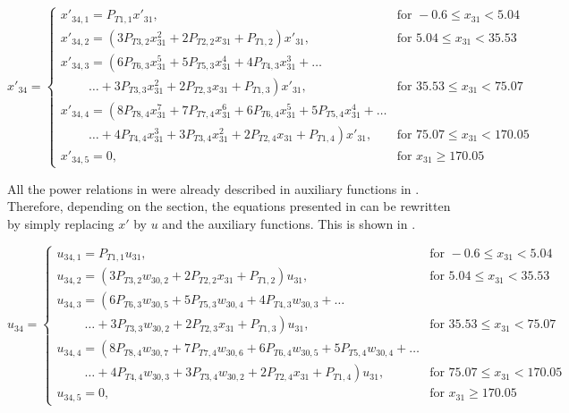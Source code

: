 \begin{equation}\label{eq:TCondDerAux}
x'_{34}=\begin{cases}
x'_{34,1}=P_{T 1,1}x'_{31}, & \text{for } -0.6 \leq x_{31} < 5.04  \\
x'_{34,2}=\left(3P_{T 3,2}x_{31}^{2}+2P_{T 2,2}x_{31}+P_{T 1,2}\right)x'_{31}, &  \text{for } 5.04\leq x_{31} < 35.53   \\
x'_{34,3}=\left(6 P_{T 6,3}x_{31}^{5}+5P_{T 5,3}x_{31}^{4}+4P_{T 4,3}x_{31}^{3}+ \dots
\right. \\
\qquad\  \left. \dotsc +3P_{T 3,3}x_{31}^{2}+2P_{T 2,3}x_{31}+P_{T 1,3}\right)x'_{31}, &  \text{for } 35.53\leq x_{31} < 75.07   \\
x'_{34,4}=\left(8 P_{T 8,4}x_{31}^{7}+7P_{T 7,4}x_{31}^{6}+6P_{T 6,4}x_{31}^{5}
+5P_{T 5,4}x_{31}^{4}+ \dots \right. \\
\qquad\  \left. \dotsc +4P_{T 4,4}x_{31}^{3}+3P_{T 3,4}x_{31}^{2}+2P_{T 2,4}x_{31}+P_{T 1,4}\right)x'_{31}, &  \text{for } 75.07\leq x_{31} < 170.05   \\
x'_{34,5}=0, &  \text{for }  x_{31} \geq 170.05   
\end{cases}
\end{equation}

All the power relations in  were already described in auxiliary functions in . Therefore, depending on the section, the equations presented in  can be rewritten by simply replacing $x'$ by $u$ and the auxiliary functions. This is shown in .

\begin{equation}\label{eq:TCondAuxF}
u_{34}=\begin{cases}
u_{34,1}=P_{T 1,1}u_{31}, & \text{for } -0.6 \leq x_{31} < 5.04  \\
u_{34,2}=\left(3P_{T 3,2}w_{30,2}+2P_{T 2,2}x_{31}+P_{T 1,2}\right)u_{31}, &  \text{for } 5.04\leq x_{31} < 35.53   \\
u_{34,3}=\left(6 P_{T 6,3}w_{30,5}+5P_{T 5,3}w_{30,4}+4P_{T 4,3}w_{30,3}+ \dots
\right. \\
\qquad\  \left. \dotsc +3P_{T 3,3}w_{30,2}+2P_{T 2,3}x_{31}+P_{T 1,3}\right)u_{31}, &  \text{for } 35.53\leq x_{31} < 75.07   \\
u_{34,4}=\left(8 P_{T 8,4}w_{30,7}+7P_{T 7,4}w_{30,6}+6P_{T 6,4}w_{30,5}
+5P_{T 5,4}w_{30,4}+ \dots \right. \\
\qquad\  \left. \dotsc +4P_{T 4,4}w_{30,3}+3P_{T 3,4}w_{30,2}+2P_{T 2,4}x_{31}+P_{T 1,4}\right)u_{31}, &  \text{for } 75.07\leq x_{31} < 170.05   \\
u_{34,5}=0, &  \text{for }  x_{31} \geq 170.05   
\end{cases}
\end{equation}

